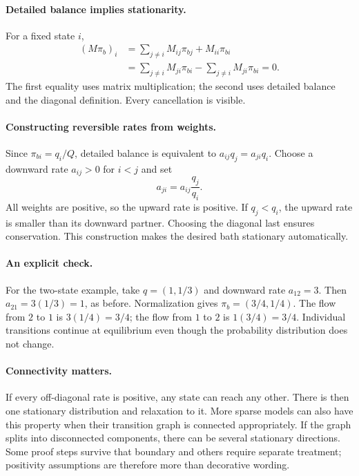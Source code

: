 \documentclass[11pt]{article}
\begin{document}
\paragraph{Detailed balance implies stationarity.}
For a fixed state $i$,
\begin{align*}
(M\pi_b)_i
&=\sum_{j\ne i}M_{ij}\pi_{bj}+M_{ii}\pi_{bi}\\
&=\sum_{j\ne i}M_{ji}\pi_{bi}
-\sum_{j\ne i}M_{ji}\pi_{bi}=0.
\end{align*}
The first equality uses matrix multiplication; the second uses detailed
balance and the diagonal definition. Every cancellation is visible.

\paragraph{Constructing reversible rates from weights.}
Since $\pi_{bi}=q_i/Q$, detailed balance is equivalent to
$a_{ij}q_j=a_{ji}q_i$. Choose a downward rate $a_{ij}>0$ for $i<j$ and set
\[
a_{ji}=a_{ij}\frac{q_j}{q_i}.
\]
All weights are positive, so the upward rate is positive. If $q_j<q_i$,
the upward rate is smaller than its downward partner. Choosing the diagonal
last ensures conservation. This construction makes the desired bath
stationary automatically.

\paragraph{An explicit check.}
For the two-state example, take $q=(1,1/3)$ and downward rate $a_{12}=3$.
Then $a_{21}=3(1/3)=1$, as before. Normalization gives
$\pi_b=(3/4,1/4)$. The flow from $2$ to $1$ is $3(1/4)=3/4$;
the flow from $1$ to $2$ is $1(3/4)=3/4$. Individual transitions continue
at equilibrium even though the probability distribution does not change.

\paragraph{Connectivity matters.}
If every off-diagonal rate is positive, any state can reach any other.
There is then one stationary distribution and relaxation to it. More
sparse models can also have this property when their transition graph is
connected appropriately. If the graph splits into disconnected components,
there can be several stationary directions. Some proof steps survive that
boundary and others require separate treatment; positivity assumptions are
therefore more than decorative wording.
\end{document}
